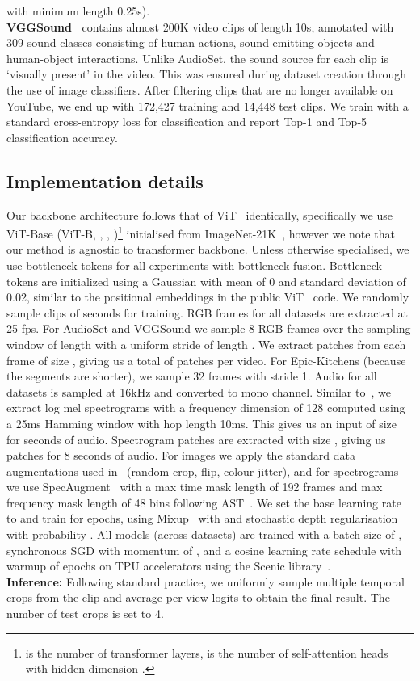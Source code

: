 with minimum length 0.25s). \\
\noindent\textbf{VGGSound~\cite{chen2020vggsound}} contains almost 200K video clips of length 10s, annotated with 309 sound classes consisting of human actions, sound-emitting objects and human-object interactions. Unlike AudioSet, the sound source for each clip is `visually present' in the video. This was ensured during dataset creation through the use of image classifiers. After filtering clips that are no longer available on YouTube, we end up with 172,427 training and 14,448 test clips. We train with a standard cross-entropy loss for classification and report Top-1 and Top-5 classification accuracy. 
\vspace{-1em}
\subsection{Implementation details} \label{sec:implementation-details}
Our backbone architecture follows that of ViT~\cite{dosovitskiy2020image} identically, specifically we use ViT-Base (ViT-B, , , )\footnote{ is the number of transformer layers,  is the number of self-attention heads with hidden dimension .} initialised from ImageNet-21K~\cite{deng2009imagenet}, however we note that our method is agnostic to transformer backbone. Unless otherwise specialised, we use  bottleneck tokens for all experiments with bottleneck fusion. Bottleneck tokens are initialized using a Gaussian with mean of 0 and standard deviation of 0.02, similar to the positional embeddings in the public ViT~\cite{dosovitskiy2020image} code. We randomly sample clips of  seconds for training. RGB frames for all datasets are extracted at 25 fps. For AudioSet and VGGSound we sample 8 RGB frames over the sampling window of length  with a uniform stride of length . 
We extract  patches from each frame of size , giving us a total of  patches per video. For Epic-Kitchens (because the segments are shorter), we sample 32 frames with stride 1.
Audio for all datasets is sampled at 16kHz and converted to mono channel. Similar to~\cite{gong2021ast}, we extract log mel spectrograms with a frequency dimension of 128 computed using a 25ms Hamming window with hop length 10ms. This gives us an input of size  for  seconds of audio. Spectrogram patches are extracted with size , giving us  patches for 8 seconds of audio.
For images we apply the standard data augmentations used in~\cite{arnab2021vivit} (random crop, flip, colour jitter), and for spectrograms we use SpecAugment~\cite{park2019specaugment} with a max time mask length of 192 frames and max frequency mask length of 48 bins following AST~\cite{gong2021ast}. We set the base learning rate to  and train for  epochs, using Mixup~\cite{zhang2017mixup} with  and stochastic depth regularisation~\cite{huang2016deep} with probability .
All models (across datasets) are trained with a batch size of , synchronous SGD with momentum of , and a cosine learning rate schedule with warmup of  epochs on TPU accelerators using the Scenic library~\cite{dehghani2021scenic}. \\
\noindent\textbf{Inference:} Following standard practice, we uniformly sample multiple temporal crops from the clip and average per-view logits to obtain the final result. The number of test crops is set to 4.


